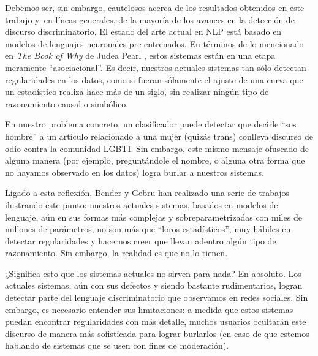 
Debemos ser, sin embargo, cautelosos acerca de los resultados obtenidos en este trabajo y, en líneas generales, de la mayoría de los avances en la detección de discurso discriminatorio. El estado del arte actual en NLP está basado en modelos de lenguajes neuronales pre-entrenados. En términos de lo mencionado en \emph{The Book of Why} de Judea Pearl \cite{pearl2018book}, estos sistemas están en una etapa meramente ``asociacional''. Es decir, nuestros actuales sistemas tan sólo detectan regularidades en los datos, como si fueran sólamente el ajuste de una curva que un estadístico realiza hace más de un siglo, sin realizar ningún tipo de razonamiento causal o simbólico.

En nuestro problema concreto, un clasificador puede detectar que decirle ``sos hombre'' a un artículo relacionado a una mujer (quizás trans) conlleva discurso de odio contra la comunidad LGBTI. Sin embargo, este mismo mensaje ofuscado de alguna manera (por ejemplo, preguntándole el nombre, o alguna otra forma que no hayamos observado en los datos) logra burlar a nuestros sistemas.

Ligado a esta reflexión, Bender y Gebru  han realizado una serie de trabajos ilustrando este punto: nuestros actuales sistemas, basados en modelos de lenguaje, aún en sus formas más complejas y sobreparametrizadas con miles de millones de parámetros, no son más que ``loros estadísticos'', muy hábiles en detectar regularidades y hacernos creer que llevan adentro algún tipo de razonamiento. Sin embargo, la realidad es que no lo tienen.

¿Significa esto que los sistemas actuales no sirven para nada? En absoluto. Los actuales sistemas, aún con sus defectos y siendo bastante rudimentarios, logran detectar parte del lenguaje discriminatorio que observamos en redes sociales. Sin embargo, es necesario entender sus limitaciones: a medida que estos sistemas puedan encontrar regularidades con más detalle, muchos usuarios ocultarán este discurso de manera más sofisticada para lograr burlarlos (en caso de que estemos hablando de sistemas que se usen con fines de moderación).
